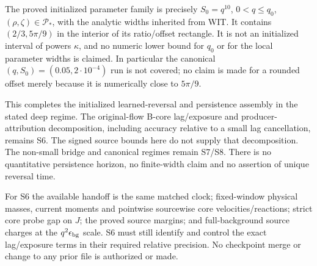 \documentclass[11pt]{article}
\numberwithin{equation}{section}
\begin{document}
The proved initialized parameter family is precisely
\(S_0=q^{10}\), \(0<q\le q_0\),
\((\rho,\zeta)\in\mathcal P_*\), with the analytic widths
inherited from WIT. It contains \((2/3,5\pi/9)\) in the
interior of its ratio/offset rectangle. It is not an initialized
interval of powers \(\kappa\), and no numeric lower bound for
\(q_0\) or for the local parameter widths is claimed.
In particular the canonical \((q,S_0)=(0.05,2\cdot10^{-4})\)
run is not covered; no claim is made for a rounded offset merely
because it is numerically close to \(5\pi/9\).

This completes the initialized learned-reversal and persistence
assembly in the stated deep regime. The original-flow B-core
lag/exposure and producer-attribution decomposition, including
accuracy relative to a small lag cancellation, remains S6.
The signed source bounds here do not supply that decomposition.
The non-small bridge and canonical regimes remain S7/S8.
There is no quantitative persistence horizon, no finite-width
claim and no assertion of unique reversal time.

For S6 the available handoff is the same matched clock; fixed-window
physical masses, current moments and pointwise sourcewise core
velocities/reactions; strict core probe gap on \(J\); the proved
source margins; and full-background source charges at the
\(q^2\epsilon_{\rm bg}\) scale. S6 must still identify and control
the exact lag/exposure terms in their required relative precision.
No checkpoint merge or change to any prior file is authorized or made.
\end{document}
